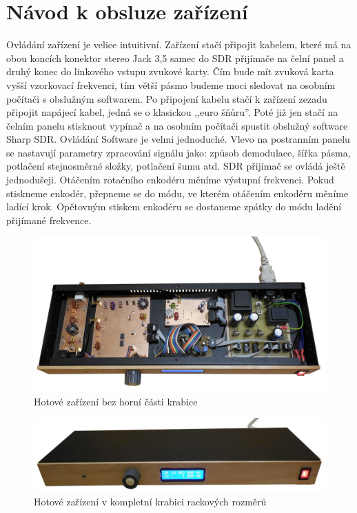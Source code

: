\clearpage

\section{Návod k obsluze zařízení}
\indent\indent Ovládání zařízení je velice intuitivní. Zařízení stačí připojit kabelem, které má na obou koncích konektor stereo Jack 3,5 samec do SDR přijímače na čelní panel a druhý konec do linkového vstupu zvukové karty. Čím bude mít zvuková karta vyšší vzorkovací frekvenci, tím větší pásmo budeme moci sledovat na osobním počítači s obslužným softwarem. Po připojení kabelu stačí k zařízení zezadu připojit napájecí kabel, jedná se o klasickou ,,euro šňůru''. Poté již jen stačí na  čelním panelu stisknout vypínač a na osobním počítači spustit obslužný software Sharp SDR. Ovládání Software je velmi jednoduché. Vlevo na postranním panelu se nastavují parametry zpracování signálu jako: způsob demodulace, šířka pásma, potlačení stejnosměrné složky, potlačení šumu atd. SDR přijímač se ovládá ještě jednodušeji. Otáčením rotačního enkodéru měníme výstupní frekvenci. Pokud stiskneme enkodér, přepneme se do módu, ve kterém otáčením enkodéru měníme ladící krok. Opětovným stiskem enkodéru se dostaneme zpátky do módu ladění přijímané frekvence.

\begin{figure}[H]
	\centering
	\includegraphics[width=170mm]{img/bez_kritu_sm.jpg}
	\caption{Hotové zařízení bez horní části krabice}    		
\end{figure}

\begin{figure}[H]
	\centering
	\includegraphics[width=170mm]{img/s_kritem_sm.jpg}
	\caption{Hotové zařízení v kompletní krabici rackových rozměrů}    		
\end{figure}

\clearpage